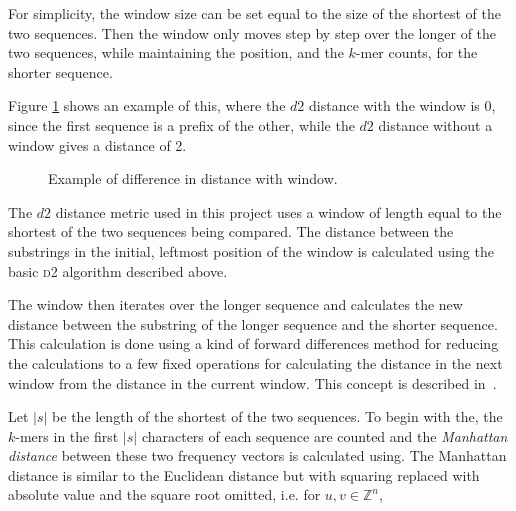 For simplicity, the window size can be set equal to the size of the shortest of
the two sequences. Then the window only moves step by step over the longer of
the two sequences, while maintaining the position, and the $k$-mer counts, for
the shorter sequence.

Figure \ref{fig:d2_window_example} shows an example of this, where the $d2$
distance with the window is 0, since the first sequence is a prefix of the
other, while the $d2$ distance without a window gives a distance of 2.

\begin{figure}[H]
\centering
{}
\caption{Example of difference in distance with window.}
\label{fig:d2_window_example}
\end{figure}

The $d2$ distance metric used in this project uses a window of length equal to
the shortest of the two sequences being compared. The distance between the
substrings in the initial, leftmost position of the window is calculated using
the basic \textsc{d2} algorithm described above.

The window then iterates over the longer sequence and calculates the new
distance between the substring of the longer sequence and the shorter sequence.
This calculation is done using a kind of forward differences method for
reducing the calculations to a few fixed operations for calculating the
distance in the next window from the distance in the current window. This
concept is described in~\cite{hazelhurst}.


Let $|s|$ be the length of the shortest of the two sequences. To begin with
the, the $k$-mers in the first $|s|$ characters of each sequence are counted
and the \emph{Manhattan distance} between these two frequency vectors is
calculated using. The Manhattan distance is similar to the Euclidean distance
but with squaring replaced with absolute value and the square root omitted,
i.e.  for $u, v \in \mathbb{Z}^n$,

